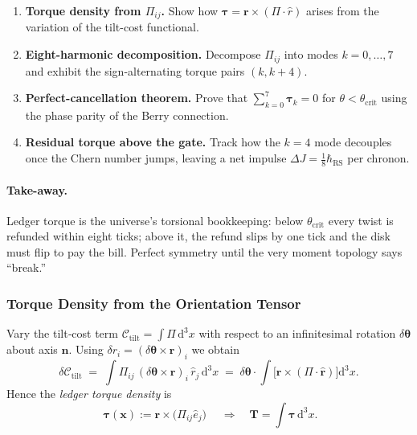 \documentclass[11pt,oneside]{book}
\begin{document}
\begin{enumerate}[label=\arabic*.,leftmargin=*,itemsep=3pt]
\item \textbf{Torque density from $\Pi_{ij}$.}  
      Show how $\boldsymbol{\tau}=\mathbf r\times(\Pi\cdot\hat r)$
      arises from the variation of the tilt-cost functional.
\item \textbf{Eight-harmonic decomposition.}  
      Decompose $\Pi_{ij}$ into modes $k=0,\dots,7$ and exhibit the
      sign-alternating torque pairs $(k,k+4)$.
\item \textbf{Perfect-cancellation theorem.}  
      Prove that $\sum_{k=0}^{7}\boldsymbol{\tau}_{k}=0$ for
      $\theta<\theta_{\text{crit}}$ using the phase parity of the
      Berry connection.
\item \textbf{Residual torque above the gate.}  
      Track how the $k=4$ mode decouples once the Chern number jumps,
      leaving a net impulse $\Delta J=\tfrac18\hbar_{\text{RS}}$ per
      chronon.
\end{enumerate}

\paragraph{Take-away.}
Ledger torque is the universe’s torsional bookkeeping: below
$\theta_{\text{crit}}$ every twist is refunded within eight ticks;
above it, the refund slips by one tick and the disk must flip to pay
the bill.  Perfect symmetry until the very moment topology says
“break.”



\subsubsection{Torque Density from the Orientation Tensor}
\label{ss:torque-density}

Vary the tilt‐cost term
$\mathcal C_{\text{tilt}} = \int \Pi\,\mathrm d^{3}x$  
with respect to an infinitesimal rotation  
$\delta\boldsymbol{\theta}$ about axis $\hat{\mathbf n}$.  
Using $\delta r_{i} = (\delta\boldsymbol{\theta}\!\times\!\mathbf r)_{i}$ we obtain
\[
   \delta\mathcal C_{\text{tilt}}
   \;=\;
   \int
      \Pi_{ij}\,(\delta\boldsymbol{\theta}\!\times\!\mathbf r)_{i}
      \,\hat r_{j}\,
      \mathrm d^{3}x
   \;=\;
   \delta\boldsymbol{\theta}\cdot
   \int
      \bigl[\mathbf r\times(\Pi\!\cdot\!\hat{\mathbf r})\bigr]
      \mathrm d^{3}x.
\]
Hence the \emph{ledger torque density} is
\begin{equation}
   \boxed{\;
      \boldsymbol{\tau}(\mathbf x)
      := \mathbf r\times\bigl(\Pi_{ij}\hat e_{j}\bigr)
      \;}
   \quad\Longrightarrow\quad
   \mathbf T
   = \int\boldsymbol{\tau}\,\mathrm d^{3}x.
   \label{eq:torque-density}
\end{equation}
\end{document}
